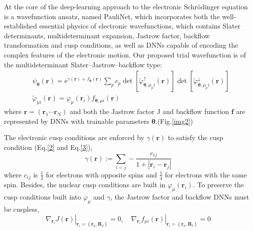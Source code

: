 \documentclass[12pt]{article}
\begin{document}
At the core of the deep-learning approach to the electronic Schrödinger equation is 
a wavefunction ansatz, named PauliNet, which incorporates both the well-established 
essential physics of electronic wavefunctions, which contains Slater determinants, 
multideterminant expansion, Jastrow factor, backflow transformation and cusp 
conditions, as well as DNNs capable of encoding the complex features of the 
electronic motion. Our proposed trial wavefunction is of the multideterminant 
Slater–Jastrow–backflow type: 
\begin{equation}
    \begin{split}
        &\psi_{\boldsymbol{\theta}}(\mathbf{r})=\mathrm{e}^{\gamma(\mathbf{r})+
        J_{\boldsymbol{\theta}}(\mathbf{r})}\sum_{p} c_{p} \operatorname{det}
        \left[\tilde{\varphi}_{\boldsymbol{\theta}, \mu_{p} i}^{\uparrow}(\mathbf{r})
        \right] \operatorname{det}\left[\tilde{\varphi}_{\boldsymbol{\theta},\mu_{p}i}
        ^{\downarrow}(\mathbf{r})\right]\\
        &\tilde{\varphi}_{\mu i}(\mathbf{r})=\varphi_{\mu}(\mathbf{r}_{i})
        f_{\boldsymbol{\theta},\mu i}(\mathbf{r})
    \end{split}
\end{equation}
where $\textbf{r}=(\textbf{r}_1\cdots\textbf{r}_N)$ and both the Jastrow factor J 
and backflow function $\textbf{f}$ are represented by DNNs with trainable parameters 
$\boldsymbol{\theta}$.(Fig.\ref{img2})

The electronic cusp conditions are enforced by $\gamma(\mathbf{r})$ to satisfy the 
cusp condition (Eq.\ref{2} and Eq.\ref{3}),
\begin{equation}
    \gamma(\mathbf{r}):=\sum_{i<j}-\frac{c_{i j}}{1+\left|\mathbf{r}_{i}-
    \mathbf{r}_{j}\right|}
\end{equation}
where $c_{ij}$ is $\frac{1}{2}$ for electrons with opposite spins and $\frac{1}{4}$ 
for electrons with the same spin. Besides, the nuclear cusp conditions are built in 
$\varphi_{\mu}(\mathbf{r}_i)$. To preserve the cusp conditions built into 
$\varphi_\mu$ and $\gamma$, the Jastrow factor and backflow DNNs must be cuspless,
\begin{equation}
    \left.\nabla_{\mathbf{r}_{i}} J(\mathbf{r})\right|_{\mathbf{r}_{i}=
    \left\{\mathbf{r}_{k}, \mathbf{R}_{I}\right\}}=0,\left.\quad 
    \nabla_{\mathbf{r}_{i}} f_{\mu i}(\mathbf{r})\right|_{\mathbf{r}_{i}=
    \left\{\mathbf{r}_{k}, \mathbf{R}_{t}\right\}}=0
\end{equation}
\end{document}
